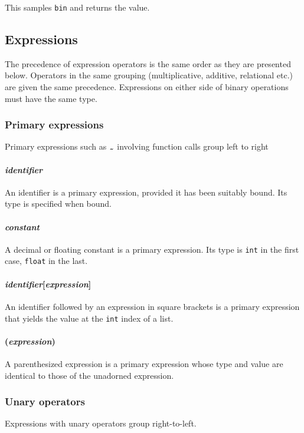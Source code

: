 This samples \texttt{bin} and returns the value.

\subsection{Expressions}

The precedence of expression operators is the same order as they are presented below. Operators in the same grouping (multiplicative, additive, relational etc.) are given the same precedence. Expressions on either side of binary operations must have the same type. 

\subsubsection{Primary expressions}
Primary expressions such as $\midtilde$ involving function calls group left to right

\paragraph{\textit{identifier}}
An identifier is a primary expression, provided it has been suitably bound. Its type is specified when bound. 

\paragraph{\textit{constant}}
A decimal or floating constant is a primary expression. Its type is \texttt{int} in the first case, \texttt{float} in the last. 

\paragraph{\textit{identifier}[\textit{expression}]}
An identifier followed by an expression in square brackets is a primary expression that yields the value at the \texttt{int}  index of a list.

\paragraph{(\textit{expression})}
A parenthesized expression is a primary expression whose type and value are identical to those of the unadorned expression. 

\subsubsection{Unary operators}
Expressions with unary operators group right-to-left.

